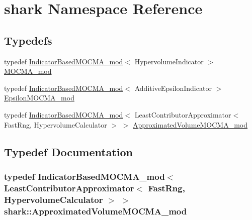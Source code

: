 \hypertarget{namespaceshark}{}\section{shark Namespace Reference}
\label{namespaceshark}
\subsection*{Typedefs}
\begin{DoxyCompactItemize}
\item 
typedef \hyperlink{classIndicatorBasedMOCMA__mod}{Indicator\+Based\+M\+O\+C\+M\+A\+\_\+mod}$<$ Hypervolume\+Indicator $>$ \hyperlink{namespaceshark_a6ed8fe07d749ee30047970d28d6b4bc7}{M\+O\+C\+M\+A\+\_\+mod}
\item 
typedef \hyperlink{classIndicatorBasedMOCMA__mod}{Indicator\+Based\+M\+O\+C\+M\+A\+\_\+mod}$<$ Additive\+Epsilon\+Indicator $>$ \hyperlink{namespaceshark_a80ca1eab4f0f42098141ae4567e38440}{Epsilon\+M\+O\+C\+M\+A\+\_\+mod}
\item 
typedef \hyperlink{classIndicatorBasedMOCMA__mod}{Indicator\+Based\+M\+O\+C\+M\+A\+\_\+mod}$<$ Least\+Contributor\+Approximator$<$ Fast\+Rng, Hypervolume\+Calculator $>$ $>$ \hyperlink{namespaceshark_a3e3bedb99e02ac9db988dcd5aa623c7f}{Approximated\+Volume\+M\+O\+C\+M\+A\+\_\+mod}
\end{DoxyCompactItemize}


\subsection{Typedef Documentation}
\subsubsection[{\texorpdfstring{Approximated\+Volume\+M\+O\+C\+M\+A\+\_\+mod}{ApproximatedVolumeMOCMA_mod}}]{\setlength{\rightskip}{0pt plus 5cm}typedef {\bf Indicator\+Based\+M\+O\+C\+M\+A\+\_\+mod}$<$ Least\+Contributor\+Approximator$<$ Fast\+Rng, Hypervolume\+Calculator $>$ $>$ {\bf shark\+::\+Approximated\+Volume\+M\+O\+C\+M\+A\+\_\+mod}}\hypertarget{namespaceshark_a3e3bedb99e02ac9db988dcd5aa623c7f}{}\label{namespaceshark_a3e3bedb99e02ac9db988dcd5aa623c7f}
